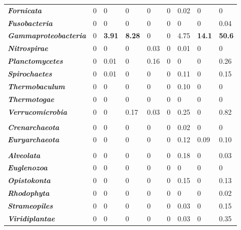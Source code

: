 \begin{table}
\begin{tabularx}{\textwidth}{p{3.5cm}p{0.6cm}p{0.8cm}p{0.8cm}p{0.6cm}p{0.5cm}p{1cm}XX}
\textbf{\emph{Fornicata}} & 0 & 0 & 0 & 0 & 0 & 0.02 & 0 & 0 \\
\textbf{\emph{Fusobacteria}} & 0 & 0 & 0 & 0 & 0 & 0 & 0 & 0.04 \\
\textbf{\emph{Gammaproteobacteria}} & 0 & \textbf{3.91} & \textbf{8.28} & 0 & 0 & 4.75 & \textbf{14.1} & \textbf{50.6} \\
\textbf{\emph{Nitrospirae}} & 0 & 0 & 0 & 0.03 & 0 & 0.01 & 0 & 0 \\
\textbf{\emph{Planctomycetes}} & 0 & 0.01 & 0 & 0.16 & 0 & 0 & 0 & 0.26 \\
\textbf{\emph{Spirochaetes}} & 0 & 0.01 & 0 & 0 & 0 & 0.11 & 0 & 0.15 \\
\textbf{\emph{Thermobaculum}} & 0 & 0 & 0 & 0 & 0 & 0.10 & 0 & 0 \\
\textbf{\emph{Thermotogae}} & 0 & 0 & 0 & 0 & 0 & 0 & 0 & 0 \\
\textbf{\emph{Verrucomicrobia}} & 0 & 0 & 0.17 & 0.03 & 0 & 0.25 & 0 & 0.82 \\
 &  &  &  &  &  &  &  &  \\
\textbf{\emph{Crenarchaeota}} & 0 & 0 & 0 & 0 & 0 & 0.02 & 0 & 0 \\
\textbf{\emph{Euryarchaeota}} & 0 & 0 & 0 & 0 & 0 & 0.12 & 0.09 & 0.10 \\
 &  &  &  &  &  &  &  &  \\
\textbf{\emph{Alveolata}} & 0 & 0 & 0 & 0 & 0 & 0.18 & 0 & 0.03 \\
\textbf{\emph{Euglenozoa}} & 0 & 0 & 0 & 0 & 0 & 0 & 0 & 0 \\
\textbf{\emph{Opistokonta}} & 0 & 0 & 0 & 0 & 0 & 0.15 & 0 & 0.13 \\
\textbf{\emph{Rhodophyta}} & 0 & 0 & 0 & 0 & 0 & 0 & 0 & 0.02 \\
\textbf{\emph{Strameopiles}} & 0 & 0 & 0 & 0 & 0 & 0.03 & 0 & 0.15 \\
\textbf{\emph{Viridiplantae}} & 0 & 0 & 0 & 0 & 0 & 0.03 & 0 & 0.35 \\
\bottomrule
\end{tabularx}
\end{table}

